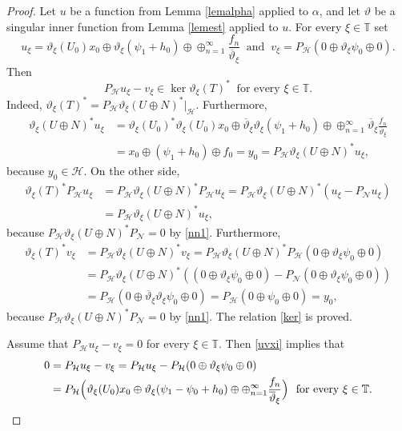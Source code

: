 \documentclass[a4paper,oneside,11pt]{amsart}
\numberwithin{equation}{section}
\theoremstyle{plain}
\theoremstyle{definition}
\begin{document}
\begin{proof}
Let $u$ be a function from Lemma \ref{lemalpha} applied to $\alpha$, and let $\vartheta$ be a singular inner function 
from  Lemma \ref{lemest} applied to $u$. 
For every $\xi\in\mathbb T$ set 
\begin{equation}\label{uvxi} u_\xi=\vartheta_\xi(U_0) x_0\oplus\vartheta_\xi(\psi_1+h_0)\oplus  
\oplus_{n=1}^\infty\frac{f_n}{\overline\vartheta_\xi}
\ \text{ and }\   v_\xi=P_{\mathcal H}(0\oplus\vartheta_\xi \psi_0\oplus 0). 
\end{equation}
Then 
\begin{equation}\label{ker} P_{\mathcal H}u_\xi-v_\xi\in\ker\vartheta_\xi(T)^* 
\ \text{  for every }\xi\in\mathbb T.
\end{equation} 
Indeed, 
$\vartheta_\xi(T)^*=P_{\mathcal H}\vartheta_\xi(U\oplus N)^*|_{\mathcal H}$. 
Furthermore, 
\begin{align*}\vartheta_\xi(U\oplus N)^*u_\xi&=\vartheta_\xi(U_0)^*\vartheta_\xi(U_0) x_0\oplus
\overline\vartheta_\xi\vartheta_\xi(\psi_1+h_0)\oplus  \oplus_{n=1}^\infty\overline\vartheta_\xi\frac{f_n}{\overline\vartheta_\xi}\\&=
x_0\oplus(\psi_1+h_0)\oplus f_0=y_0=P_{\mathcal H}\vartheta_\xi(U\oplus N)^*u_\xi, 
\end{align*}
because $y_0\in\mathcal H$.
On the other side, 
\begin{align*}\vartheta_\xi(T)^*P_{\mathcal H}u_\xi&=P_{\mathcal H}\vartheta_\xi(U\oplus N)^*P_{\mathcal H}u_\xi
=P_{\mathcal H}\vartheta_\xi(U\oplus N)^*(u_\xi-P_{\mathcal N}u_\xi)\\&=P_{\mathcal H}\vartheta_\xi(U\oplus N)^*u_\xi,
\end{align*}
because $P_{\mathcal H}\vartheta_\xi(U\oplus N)^*P_{\mathcal N}=0$ by \eqref{nn1}. 
Furthermore, 
\begin{align*}\vartheta_\xi(T)^*v_\xi&=P_{\mathcal H}\vartheta_\xi(U\oplus N)^*v_\xi=
P_{\mathcal H}\vartheta_\xi(U\oplus N)^*P_{\mathcal H}(0\oplus\vartheta_\xi \psi_0\oplus 0)
\\&=P_{\mathcal H}\vartheta_\xi(U\oplus N)^*((0\oplus\vartheta_\xi \psi_0\oplus 0)-
P_{\mathcal N}(0\oplus\vartheta_\xi \psi_0\oplus 0))\\&=
P_{\mathcal H}(0\oplus\overline\vartheta_\xi \vartheta_\xi \psi_0\oplus 0)=
P_{\mathcal H}(0\oplus \psi_0\oplus 0)=y_0,
\end{align*}because $P_{\mathcal H}\vartheta_\xi(U\oplus N)^*P_{\mathcal N}=0$ by \eqref{nn1}. 
The relation \eqref{ker} is proved. 

Assume that $P_{\mathcal H}u_\xi-v_\xi=0$ for every $\xi\in\mathbb T$.  Then  \eqref{uvxi} implies that 
\begin{equation}\label{mainxi}
\begin{aligned}
0&=P_{\mathcal H}u_\xi-v_\xi=P_{\mathcal H}u_\xi-P_{\mathcal H}(0\oplus\vartheta_\xi \psi_0\oplus 0)\\&=
P_{\mathcal H}\Bigl(\vartheta_\xi(U_0) x_0\oplus\vartheta_\xi (\psi_1-\psi_0+h_0)\oplus  
\oplus_{n=1}^\infty\frac{f_n}{\overline\vartheta_\xi}\Bigr)\ \text{ for every }\xi\in\mathbb T.
\end{aligned}
\end{equation}


\end{proof}
\end{document}
